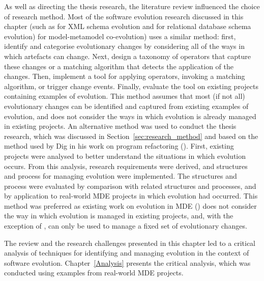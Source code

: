 As well as directing the thesis research, the literature review influenced the choice of research method. Most of the software evolution research discussed in this chapter (such as \cite{guerrini05impact,kramer01xem,su01xem} for XML schema evolution and \cite{banerjee87semantics,edelweiss05temporal} for relational database schema evolution) for model-metamodel co-evolution) uses a similar method: first, identify and categorise evolutionary changes by considering all of the ways in which artefacts can change. Next, design a taxonomy of operators that capture these changes or a matching algorithm that detects the application of the changes. Then, implement a tool for applying operators, invoking a matching algorithm, or trigger change events. Finally, evaluate the tool on existing projects containing examples of evolution. This method assumes that most (if not all) evolutionary changes can be identified and captured from existing examples of evolution, and does not consider the ways in which evolution is already managed in existing projects. An alternative method was used to conduct the thesis research, which was discussed in Section~\ref{sec:research_method} and based on the method used by Dig in his work on program refactoring (\cite{dig06apis,dig06automatic,dig06detection,dig07cms}). First, existing projects were analysed to better understand the situations in which evolution occurs. From this analysis, research requirements were derived, and structures and process for managing evolution were implemented. The structures and process were evaluated by comparison with related structures and processes, and by application to real-world MDE projects in which evolution had occurred. This method was preferred as existing work on evolution in MDE (\cite{wachsmuth07metamodel,herrmannsdoerfer09cope,cicchetti08automating,garces09managing}) does not consider the way in which evolution is managed in existing projects, and, with the exception of \cite{herrmannsdoerfer09cope}, can only be used to manage a fixed set of evolutionary changes.

The review and the research challenges presented in this chapter led to a critical analysis of techniques for identifying and managing evolution in the context of software evolution. Chapter~\ref{Analysis} presents the critical analysis, which was conducted using examples from real-world MDE projects.